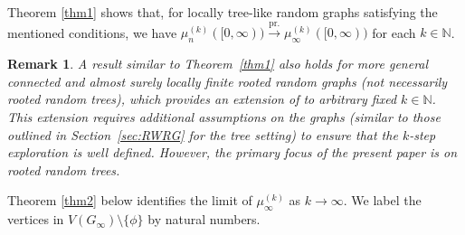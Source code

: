 \documentclass[11pt]{article}
\numberwithin{equation}{section}
\theoremstyle{plain}
\newtheorem{remark}[theorem]{Remark}
\newcommand{\N}{\mathbb N}
\newcommand{\prob}{\overset{\mathrm{pr.}}{\longrightarrow}}
\begin{document}
\noindent
Theorem \ref{thm1} shows that, for locally tree-like random graphs satisfying the mentioned conditions, we have $\mu_{n}^{(k)}([0,\infty)) \prob \mu^{(k)}_{\infty}([0,\infty))$ for each $k\in\N$. 

\begin{remark}
\rm{A result similar to Theorem~\ref{thm1} also holds for more general connected and almost surely locally finite rooted random graphs (not necessarily rooted random trees), which provides an extension of \cite[Theorems~2.2 and 2.3]{HHP} to arbitrary fixed $k \in \N$. This extension requires additional assumptions on the graphs (similar to those outlined in Section~\ref{sec:RWRG} for the tree setting) to ensure that the $k$-step exploration is well defined. However, the primary focus of the present paper is on rooted random trees.}
\end{remark}

Theorem \ref{thm2} below identifies the limit of $\mu^{(k)}_{\infty}$ as $k\to\infty$. We label the vertices in $V(G_{\infty})\setminus\{\phi\}$ by natural numbers.
\end{document}
